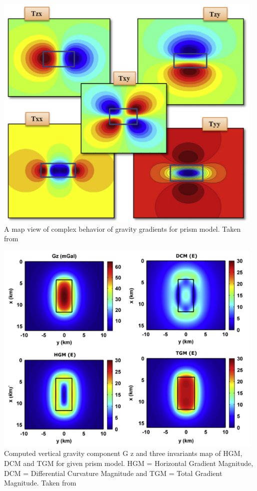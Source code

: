 \begin{center}
\includegraphics[width=13cm]{images/gravity/duti16b}\\
{\captionfont A map view of complex behavior of gravity gradients for prism model. Taken from \cite{duti16}}
\end{center}

\begin{center}
\includegraphics[width=13cm]{images/gravity/duti16c}\\
{\captionfont Computed vertical gravity component G z and three invariants map of HGM, DCM and TGM 
for given prism model. HGM = Horizontal Gradient Magnitude,
DCM = Differential Curvature Magnitude and TGM = Total Gradient Magnitude. Taken from \cite{duti16}}
\end{center}







